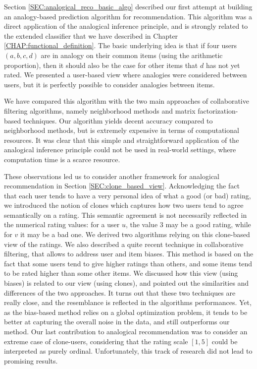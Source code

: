 Section \ref{SEC:analogical_reco_basic_algo} described our first attempt at building an analogy-based
prediction algorithm for recommendation. This algorithm was a direct
application of the analogical inference principle, and is strongly related to
the extended classifier that we have described in Chapter
\ref{CHAP:functional_definition}. The basic
underlying idea is that if four users $(a, b, c, d)$ are in analogy on their
common items (using the arithmetic proportion), then it should also be the
case for other items that $d$ has not yet rated. We presented a user-based view
where analogies were considered between users, but it is perfectly possible to
consider analogies between items.

We have compared this algorithm with the two main approaches of collaborative
filtering algorithms, namely neighborhood methods and matrix
factorization-based techniques. Our algorithm yields decent accuracy compared
to neighborhood methods, but is extremely expensive in terms of computational resources.
It was clear that this simple and straightforward application of the analogical
inference principle could not be used in real-world settings, where computation
time is a scarce resource.

These observations led us to consider another framework for analogical
recommendation in Section \ref{SEC:clone_based_view}. Acknowledging the fact
that each user tends to have a very
personal idea of what a good (or bad) rating, we introduced the notion of clones
which captures how two users tend to agree semantically on a rating. This
semantic agreement is not necessarily reflected in the numerical rating values:
for a user $u$, the value 3 may
be a good rating, while for $v$ it may be a bad one. We derived two algorithms
relying on this clone-based view of the ratings. We also described a quite
recent technique in collaborative filtering, that allows to address user and
item biases. This method is based on the fact that some users tend to give
higher ratings than others, and some items tend to be rated higher than some
other items. We discussed how this view (using biases) is related to our view
(using clones), and pointed out the similarities and differences of the two
approaches. It turns out that these two techniques are really close, and the
resemblance is reflected in the algorithms performances. Yet, as the bias-based
method relies on a global optimization problem, it tends to be better at
capturing the overall noise in the data, and still outperforms our method. Our
last contribution to analogical recommendation was to consider an extreme case
of clone-users, considering that the rating scale $[1, 5]$ could be interpreted
as purely ordinal. Unfortunately, this track of research did not lead to promising results.


